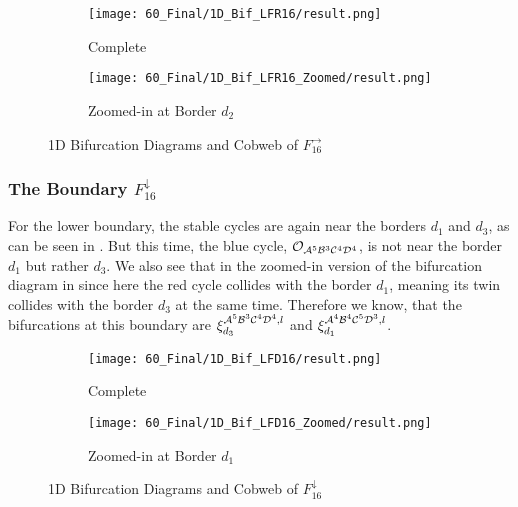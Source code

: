 \begin{figure}
    \centering
    \begin{subfigure}{0.4\textwidth}
        \centering
        \texttt{[image: 60\_Final/1D\_Bif\_LFR16/result.png]}
        \caption{Complete}
        \label{fig:final.bifurcation.F.right}
    \end{subfigure}
    \begin{subfigure}{0.4\textwidth}
        \centering
        \texttt{[image: 60\_Final/1D\_Bif\_LFR16\_Zoomed/result.png]}
        \caption{Zoomed-in at Border $d_2$}
        \label{fig:final.bifurcation.F.right.zoomed}
    \end{subfigure}
    \caption{1D Bifurcation Diagrams and Cobweb of $F_{16}^\rightarrow$}
\end{figure}

\subsubsection{The Boundary $F_{16}^\downarrow$}

For the lower boundary, the stable cycles are again near the borders $d_1$ and $d_3$, as can be seen in .
But this time, the blue cycle, $\mathcal{O}_{\mathcal{A}^5\mathcal{B}^3\mathcal{C}^4\mathcal{D}^4}$, is not near the border $d_1$ but rather $d_3$.
We also see that in the zoomed-in version of the bifurcation diagram in  since here the red cycle collides with the border $d_1$, meaning its twin collides with the border $d_3$ at the same time.
Therefore we know, that the bifurcations at this boundary are $\xi_{d_3}^{\mathcal{A}^5\mathcal{B}^3\mathcal{C}^4\mathcal{D}^4, l}$ and $\xi_{d_1}^{\mathcal{A}^4\mathcal{B}^4\mathcal{C}^5\mathcal{D}^3, l}$.

\begin{figure}
    \centering
    \begin{subfigure}{0.4\textwidth}
        \centering
        \texttt{[image: 60\_Final/1D\_Bif\_LFD16/result.png]}
        \caption{Complete}
        \label{fig:final.bifurcation.F.down}
    \end{subfigure}
    \begin{subfigure}{0.4\textwidth}
        \centering
        \texttt{[image: 60\_Final/1D\_Bif\_LFD16\_Zoomed/result.png]}
        \caption{Zoomed-in at Border $d_1$}
        \label{fig:final.bifurcation.F.down.zoomed}
    \end{subfigure}
    \caption{1D Bifurcation Diagrams and Cobweb of $F_{16}^\downarrow$}
\end{figure}

